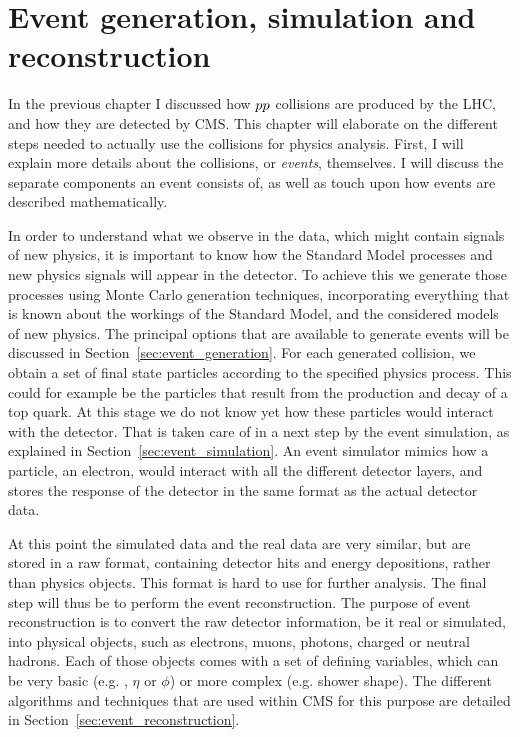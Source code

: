 \chapter{Event generation, simulation and reconstruction \label{chap:event_generation}}

In the previous chapter I discussed how ${p}{p}$ collisions are produced by the LHC, and
how they are detected by CMS. This chapter will elaborate on the different
steps needed to actually use the collisions for physics analysis. 
First, I will explain more details about the collisions, or \textit{events}, themselves. I will
discuss the separate components an event consists of, as well as touch upon how events are described
mathematically. 

In order to understand what we observe in the data, which might contain signals of new physics, it
is important to know how the Standard Model processes and new physics signals will appear in the
detector. To achieve this we generate those processes using Monte Carlo generation techniques,
incorporating everything that is known about the workings of the Standard Model, and the
considered models of new physics. 
The principal options that are available to generate
events will be discussed in Section~\ref{sec:event_generation}. 
For each generated collision, we obtain a set of final state particles according to the specified
physics process. This could for example be the particles that result from the production and decay
of a top quark. 
At this stage we do not know yet how these particles would interact with the detector. That is
taken care of in a next step by the event simulation, as explained in
Section~\ref{sec:event_simulation}. An event simulator mimics how a particle, \eg an electron,
would interact with all the different detector layers, and stores the response of the detector in
the same format as the actual detector data. 

At this point the simulated data and the real data are very similar, but are stored in a raw format,
containing detector hits and energy depositions, rather than physics objects. This format is hard to
use for further analysis. The final step will thus be to perform the event reconstruction. The
purpose of event reconstruction is to convert the raw detector information, be it real or simulated,
into physical objects, such as electrons, muons, photons, charged or neutral hadrons. Each of those
objects comes with a set of defining variables, which can be very basic (e.g. \pt, $\eta$ or $\phi$)
or more complex (e.g. shower shape). The different algorithms and techniques that are used within
CMS for this purpose are detailed in Section~\ref{sec:event_reconstruction}. 

